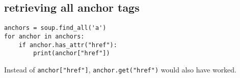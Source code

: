 \documentclass[a4paper, 12pt]{article}
\begin{document}
\subsection{retrieving all anchor tags}
\begin{verbatim}
anchors = soup.find_all('a')
for anchor in anchors:
    if anchor.has_attr("href"):
        print(anchor["href"])
\end{verbatim}
Instead of \verb|anchor["href"]|, \verb|anchor.get("href")| would also have worked.
\end{document}
